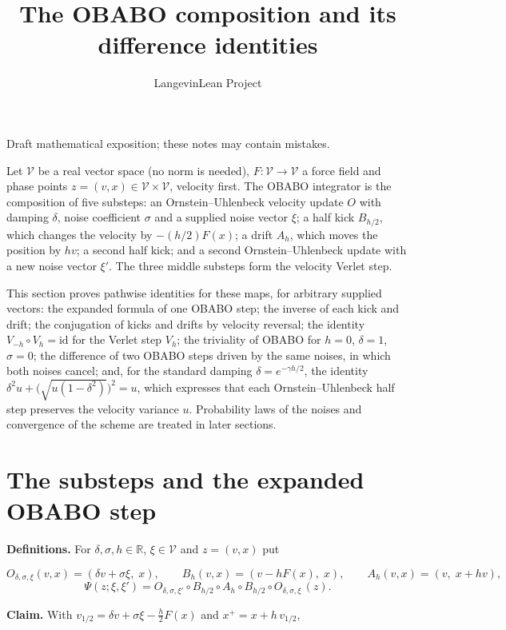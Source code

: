 \documentclass[11pt,a4paper]{article}
\title{\texorpdfstring{The OBABO composition and its difference identities}{The OBABO composition and its difference identities}}
\author{LangevinLean Project}
\date{}
\begin{document}
\maketitle
Draft mathematical exposition; these notes may contain mistakes.


Let \(\mathcal V\) be a real vector space (no norm is needed), \(F:\mathcal V\to\mathcal V\) a force field and phase points \(z=(v,x)\in\mathcal V\times\mathcal V\), velocity first. The OBABO integrator is the composition of five substeps: an Ornstein–Uhlenbeck velocity update \(O\) with damping \(\delta\), noise coefficient \(\sigma\) and a supplied noise vector \(\xi\); a half kick \(B_{h/2}\), which changes the velocity by \(-(h/2)F(x)\); a drift \(A_h\), which moves the position by \(hv\); a second half kick; and a second Ornstein–Uhlenbeck update with a new noise vector \(\xi'\). The three middle substeps form the velocity Verlet step.




This section proves pathwise identities for these maps, for arbitrary supplied vectors: the expanded formula of one OBABO step; the inverse of each kick and drift; the conjugation of kicks and drifts by velocity reversal; the identity \(V_{-h}\circ V_h=\mathrm{id}\) for the Verlet step \(V_h\); the triviality of OBABO for \(h=0\), \(\delta=1\), \(\sigma=0\); the difference of two OBABO steps driven by the same noises, in which both noises cancel; and, for the standard damping \(\delta=e^{-\gamma h/2}\), the identity \(\delta^2u+\bigl(\sqrt{u(1-\delta^2)}\bigr)^2=u\), which expresses that each Ornstein–Uhlenbeck half step preserves the velocity variance \(u\). Probability laws of the noises and convergence of the scheme are treated in later sections.


\section{\texorpdfstring{The substeps and the expanded OBABO step}{The substeps and the expanded OBABO step}}


\textbf{Definitions.} For \(\delta,\sigma,h\in\mathbb R\), \(\xi\in\mathcal V\) and \(z=(v,x)\) put


\[O_{\delta,\sigma,\xi}(v,x)=(\delta v+\sigma\xi,\;x),\qquad B_h(v,x)=(v-hF(x),\;x),\qquad A_h(v,x)=(v,\;x+hv),\]
\[\Psi(z;\xi,\xi')=O_{\delta,\sigma,\xi'}\circ B_{h/2}\circ A_h\circ B_{h/2}\circ O_{\delta,\sigma,\xi}\,(z).\]


\textbf{Claim.} With \(v_{1/2}=\delta v+\sigma\xi-\tfrac h2F(x)\) and \(x^+=x+h\,v_{1/2}\),
\end{document}
